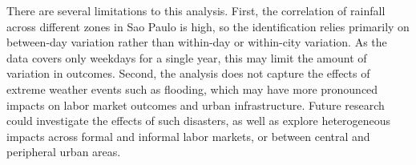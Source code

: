 There are several limitations to this analysis. First, the correlation of rainfall across different zones in Sao Paulo is high, so the identification relies primarily on between-day variation rather than within-day or within-city variation. As the data covers only weekdays for a single year, this may limit the amount of variation in outcomes. Second, the analysis does not capture the effects of extreme weather events such as flooding, which may have more pronounced impacts on labor market outcomes and urban infrastructure. Future research could investigate the effects of such disasters, as well as explore heterogeneous impacts across formal and informal labor markets, or between central and peripheral urban areas.

